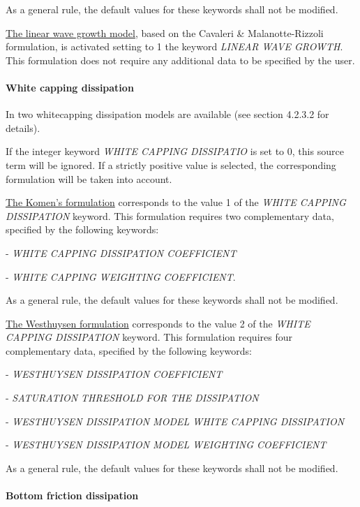   \textit{}

As a general rule, the default values for these keywords shall not be modified.

\underline{  The linear wave growth model}, based on the Cavaleri \& Malanotte-Rizzoli formulation, is activated setting to 1 the
keyword \textit{LINEAR WAVE GROWTH}. This formulation does not require any additional data to be specified by the user.


\paragraph{ White capping dissipation}

 In \tomawac two whitecapping dissipation models are available (see section 4.2.3.2 for details).

 If the integer keyword \textit{WHITE CAPPING DISSIPATIO} is set to 0, this source term will be ignored. If a strictly positive value
 is selected, the corresponding formulation will be taken into account.

 \underline{  The Komen's formulation} corresponds to the value 1 of the \textit{WHITE CAPPING DISSIPATION} keyword. This formulation requires two complementary data, specified by the following keywords:   

- \textit{WHITE CAPPING DISSIPATION COEFFICIENT}   

- \textit{WHITE CAPPING WEIGHTING COEFFICIENT}.

  \textit{}

 As a general rule, the default values for these keywords shall not be modified.

 \underline{  The Westhuysen formulation} corresponds to the value 2 of the \textit{WHITE CAPPING DISSIPATION} keyword. This formulation requires four complementary data, specified by the following keywords:  

-  \textit{WESTHUYSEN DISSIPATION COEFFICIENT}

-  \textit{SATURATION THRESHOLD FOR THE DISSIPATION}

-  \textit{WESTHUYSEN DISSIPATION MODEL WHITE CAPPING DISSIPATION}

-  \textit{WESTHUYSEN DISSIPATION MODEL WEIGHTING COEFFICIENT}

  \textit{}

As a general rule, the default values for these keywords shall not be modified.

\paragraph{ Bottom friction dissipation}

